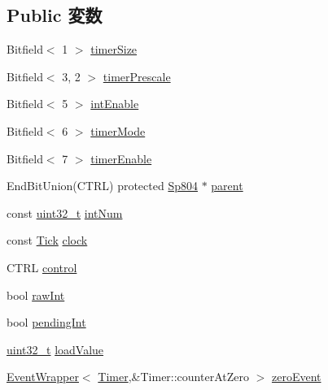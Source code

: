 \subsection*{Public 変数}
\begin{DoxyCompactItemize}
\item 
Bitfield$<$ 1 $>$ \hyperlink{classSp804_1_1Timer_a3952efcfdef8f7aa15b0ebcdbbe4bdd3}{timerSize}
\item 
Bitfield$<$ 3, 2 $>$ \hyperlink{classSp804_1_1Timer_afd859e1d86a57cb7711f17ab63ad4646}{timerPrescale}
\item 
Bitfield$<$ 5 $>$ \hyperlink{classSp804_1_1Timer_aa5de02b5e99e1f995e2f01bf8336e224}{intEnable}
\item 
Bitfield$<$ 6 $>$ \hyperlink{classSp804_1_1Timer_aa71cecfa28f348244319827543df9e18}{timerMode}
\item 
Bitfield$<$ 7 $>$ \hyperlink{classSp804_1_1Timer_ab193f92c9325928a8fbfe941540db1a0}{timerEnable}
\item 
EndBitUnion(CTRL) protected \hyperlink{classSp804}{Sp804} $\ast$ \hyperlink{classSp804_1_1Timer_a0e5173aee1e61e68810b199b498223b8}{parent}
\item 
const \hyperlink{Type_8hh_a435d1572bf3f880d55459d9805097f62}{uint32\_\-t} \hyperlink{classSp804_1_1Timer_a4685f3f9289d179d8e500f7ad5ad20ed}{intNum}
\item 
const \hyperlink{base_2types_8hh_a5c8ed81b7d238c9083e1037ba6d61643}{Tick} \hyperlink{classSp804_1_1Timer_a9461588ed360796ba2408cc9e90e0ab8}{clock}
\item 
CTRL \hyperlink{classSp804_1_1Timer_a8e8d336fe93a134873147e3282e103fb}{control}
\item 
bool \hyperlink{classSp804_1_1Timer_a5f9476d82d9f414dccd9b49558d459bc}{rawInt}
\item 
bool \hyperlink{classSp804_1_1Timer_af3f4acf42e0f2210078e61204edbab91}{pendingInt}
\item 
\hyperlink{Type_8hh_a435d1572bf3f880d55459d9805097f62}{uint32\_\-t} \hyperlink{classSp804_1_1Timer_a21dfc3b5f848baeba0be506b5b289485}{loadValue}
\item 
\hyperlink{classEventWrapper}{EventWrapper}$<$ \hyperlink{classSp804_1_1Timer}{Timer},\&Timer::counterAtZero $>$ \hyperlink{classSp804_1_1Timer_adc49d182c815493be0b95fda604da5da}{zeroEvent}
\end{DoxyCompactItemize}


